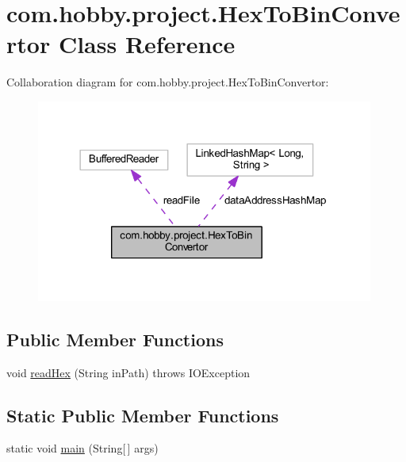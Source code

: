 \hypertarget{classcom_1_1hobby_1_1project_1_1_hex_to_bin_convertor}{}\section{com.\+hobby.\+project.\+Hex\+To\+Bin\+Convertor Class Reference}
\label{classcom_1_1hobby_1_1project_1_1_hex_to_bin_convertor}


Collaboration diagram for com.\+hobby.\+project.\+Hex\+To\+Bin\+Convertor\+:
\nopagebreak
\begin{figure}[H]
\begin{center}
\leavevmode
\includegraphics[width=314pt]{classcom_1_1hobby_1_1project_1_1_hex_to_bin_convertor__coll__graph}
\end{center}
\end{figure}
\subsection*{Public Member Functions}
\begin{DoxyCompactItemize}
\item 
void \hyperlink{classcom_1_1hobby_1_1project_1_1_hex_to_bin_convertor_aa8274cd08e200940cfe99c93292c5aec}{read\+Hex} (String in\+Path)  throws I\+O\+Exception 
\end{DoxyCompactItemize}
\subsection*{Static Public Member Functions}
\begin{DoxyCompactItemize}
\item 
static void \hyperlink{classcom_1_1hobby_1_1project_1_1_hex_to_bin_convertor_a5b0f6478c67aa0b3f03784f306bf30e5}{main} (String\mbox{[}$\,$\mbox{]} args)
\end{DoxyCompactItemize}


